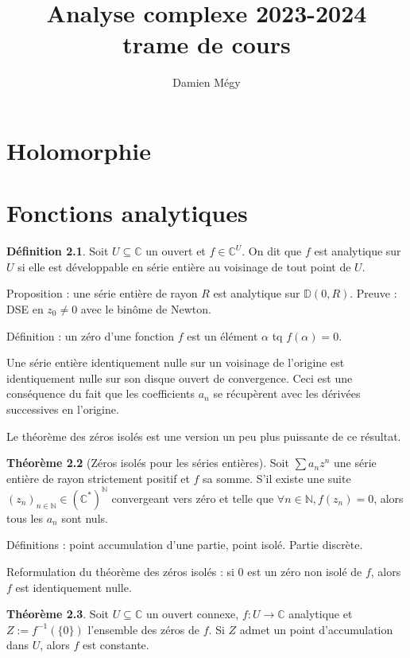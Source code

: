 \documentclass[11pt,a4paper]{book}
\title{Analyse complexe 2023-2024\\ trame de cours}
\author{Damien Mégy}
\newcommand{\N}{\mathbb{N}}
\newcommand{\D}{\mathbb{D}}
\newcommand{\C}{\mathbb{C}}
\theoremstyle{definition}
\newtheorem{theoreme}{Th\'eor\`eme}[section]
\newtheorem{definition}[theoreme]{D\'efinition}
\theoremstyle{plain}
\begin{document}
\maketitle
\tableofcontents

\chapter{Holomorphie}

\chapter{Fonctions analytiques}

\begin{definition}
Soit $U\subseteq \C$ un ouvert et $f \in \C^U$.
On dit que $f$ est analytique sur $U$ si elle est développable en série entière au voisinage de tout point de $U$.
\end{definition}

Proposition : une série entière de rayon $R$ est analytique sur $\D(0,R)$. Preuve : DSE en $z_0\neq 0$ avec le binôme de Newton.

Définition : un zéro d'une fonction $f$ est un élément $\alpha$ tq $f(\alpha)=0$.


Une série entière identiquement nulle sur un voisinage de l'origine est identiquement nulle sur son disque ouvert de convergence.
Ceci est une conséquence du fait que les coefficients $a_n$ se récupèrent avec les dérivées successives en l'origine. 

Le théorème des zéros isolés est une version un peu plus puissante de ce résultat.

\begin{theoreme}[Zéros isolés pour les séries entières]
Soit $\sum a_nz^n$ une série entière de rayon strictement positif et $f$ sa somme.
S'il existe une suite $(z_n)_{n\in \N} \in (\C^*)^\N$ convergeant vers zéro et telle que $\forall n\in\N, f(z_n)=0$, alors tous les $a_n$ sont nuls.
\end{theoreme}



Définitions : point accumulation d'une partie, point isolé. Partie discrète.

Reformulation du théorème des zéros isolés : si $0$ est un zéro non isolé de $f$, alors $f$ est identiquement nulle.

\begin{theoreme}
Soit $U\subseteq \C$ un ouvert connexe,  $f:U\to\C$ analytique et $Z:=f^{-1}(\{0\})$ l'ensemble des zéros de $f$.
Si $Z$ admet un point d'accumulation dans $U$, alors $f$ est constante.
\end{theoreme}
\end{document}
